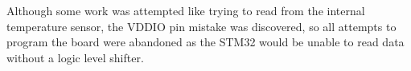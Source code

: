 Although some work was attempted like trying to read from the internal temperature sensor, the VDDIO pin mistake was discovered, so all attempts to program the board were abandoned as the STM32 would be unable to read data without a logic level shifter.